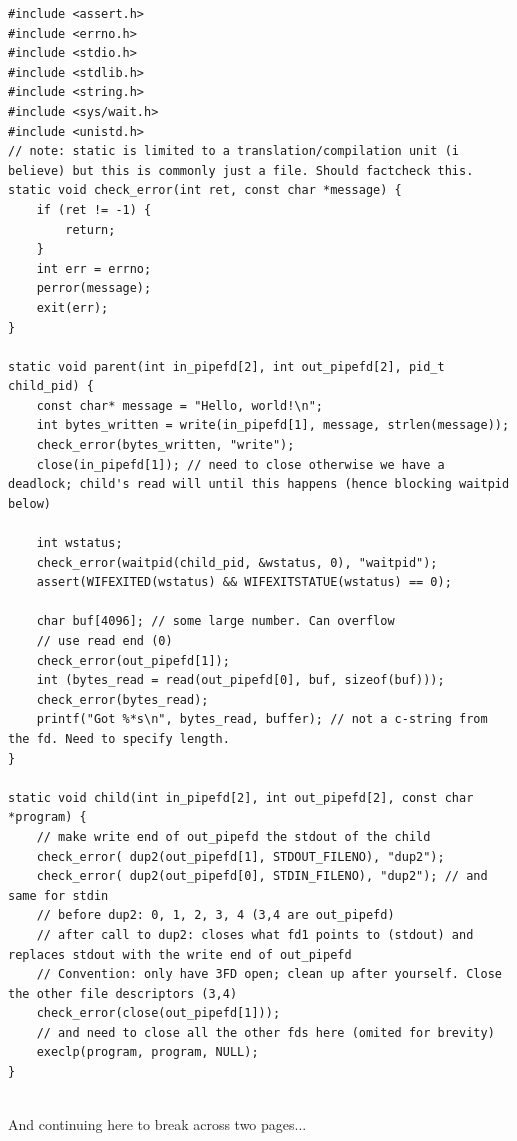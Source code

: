 \documentclass[../notes.tex]{subfiles}
\begin{document}
\begin{listing}[H]
\begin{verbatim}
#include <assert.h>
#include <errno.h>
#include <stdio.h>
#include <stdlib.h>
#include <string.h>
#include <sys/wait.h>
#include <unistd.h>
// note: static is limited to a translation/compilation unit (i believe) but this is commonly just a file. Should factcheck this.
static void check_error(int ret, const char *message) {
    if (ret != -1) {
        return;
    }
    int err = errno;
    perror(message);
    exit(err);
}

static void parent(int in_pipefd[2], int out_pipefd[2], pid_t child_pid) {
    const char* message = "Hello, world!\n";
    int bytes_written = write(in_pipefd[1], message, strlen(message));
    check_error(bytes_written, "write");
    close(in_pipefd[1]); // need to close otherwise we have a deadlock; child's read will until this happens (hence blocking waitpid below)

    int wstatus;
    check_error(waitpid(child_pid, &wstatus, 0), "waitpid");
    assert(WIFEXITED(wstatus) && WIFEXITSTATUE(wstatus) == 0);

    char buf[4096]; // some large number. Can overflow
    // use read end (0)
    check_error(out_pipefd[1]);
    int (bytes_read = read(out_pipefd[0], buf, sizeof(buf)));
    check_error(bytes_read);
    printf("Got %*s\n", bytes_read, buffer); // not a c-string from the fd. Need to specify length.
}

static void child(int in_pipefd[2], int out_pipefd[2], const char *program) {
    // make write end of out_pipefd the stdout of the child
    check_error( dup2(out_pipefd[1], STDOUT_FILENO), "dup2");
    check_error( dup2(out_pipefd[0], STDIN_FILENO), "dup2"); // and same for stdin
    // before dup2: 0, 1, 2, 3, 4 (3,4 are out_pipefd)
    // after call to dup2: closes what fd1 points to (stdout) and replaces stdout with the write end of out_pipefd
    // Convention: only have 3FD open; clean up after yourself. Close the other file descriptors (3,4)
    check_error(close(out_pipefd[1]));
    // and need to close all the other fds here (omited for brevity)
    execlp(program, program, NULL);
}


\end{verbatim}
\end{listing}

And continuing here to break across two pages...
\end{document}
